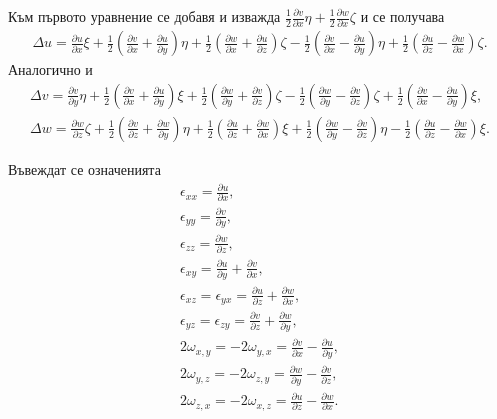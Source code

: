 \documentclass{report}
\begin{document}
	Към първото уравнение се добавя и изважда $\displaystyle \frac{1}{2}\frac{\partial v}{\partial x}\eta + \frac{1}{2}\frac{\partial w}{\partial x}\zeta$ и се получава 
	\begin{align*}
		\Delta u = \frac{\partial u}{\partial x} \xi + \frac{1}{2}(\frac{\partial v}{\partial x}+\frac{\partial u}{\partial y} )\eta + \frac{1}{2}(\frac{\partial w}{\partial x}+\frac{\partial u}{\partial z} )\zeta-\frac{1}{2}(\frac{\partial v}{\partial x}-\frac{\partial u}{\partial y} )\eta + \frac{1}{2}(\frac{\partial u}{\partial z}-\frac{\partial w}{\partial x} )\zeta.
	\end{align*}
	Аналогично и
	\begin{align*}
		\Delta v = \frac{\partial v}{\partial y} \eta + \frac{1}{2}(\frac{\partial v}{\partial x}+\frac{\partial u}{\partial y} )\xi + \frac{1}{2}(\frac{\partial w}{\partial y}+\frac{\partial v}{\partial z} )\zeta-\frac{1}{2}(\frac{\partial w}{\partial y}-\frac{\partial v}{\partial z} )\zeta + \frac{1}{2}(\frac{\partial v}{\partial x}-\frac{\partial u}{\partial y} )\xi,
		\\
		\Delta w = \frac{\partial w}{\partial z} \zeta + \frac{1}{2}(\frac{\partial v}{\partial z}+\frac{\partial w}{\partial y} )\eta + \frac{1}{2}(\frac{\partial u}{\partial z}+\frac{\partial w}{\partial x} )\xi+\frac{1}{2}(\frac{\partial w}{\partial y}-\frac{\partial v}{\partial z} )\eta - \frac{1}{2}(\frac{\partial u}{\partial z}-\frac{\partial w}{\partial x} ) \xi.
	\end{align*}
	
	Въвеждат се означенията
	\begin{align*}
		\epsilon_{xx}=\frac{\partial u}{\partial x},\\
		\epsilon_{yy}=\frac{\partial v}{\partial y},\\
		\epsilon_{zz}=\frac{\partial w}{\partial z},\\
		\epsilon_{xy}=\frac{\partial u}{\partial y}+\frac{\partial v}{\partial x},\\
		\epsilon_{xz}=\epsilon_{yx}=\frac{\partial u}{\partial z}+\frac{\partial w}{\partial x},\\
		\epsilon_{yz}=\epsilon_{zy}=\frac{\partial v}{\partial z}+\frac{\partial w}{\partial y},\\
		2\omega_{x,y}=-2\omega_{y,x}=\frac{\partial v}{\partial x}-\frac{\partial u}{\partial y},\\
		2\omega_{y,z}=-2\omega_{z,y}=\frac{\partial w}{\partial y}-\frac{\partial v}{\partial z},\\
		2\omega_{z,x}=-2\omega_{x,z}=\frac{\partial u}{\partial z}-\frac{\partial w}{\partial x}.\\
	\end{align*}
	
\end{document}
